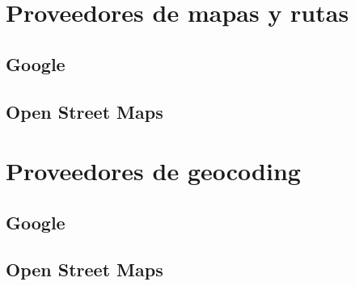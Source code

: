 \section{Proveedores de mapas y rutas}


\subsection{Google}


\subsection{Open Street Maps}


\section{Proveedores de geocoding}


\subsection{Google}


\subsection{Open Street Maps}

